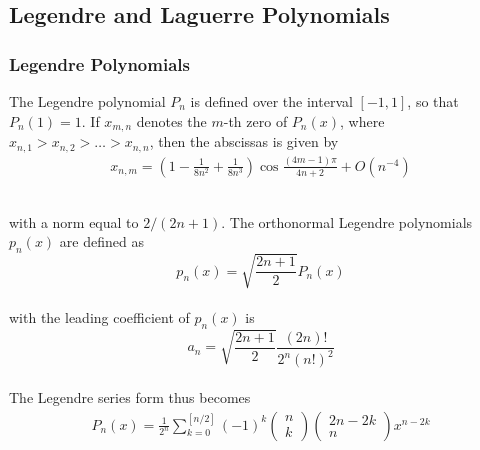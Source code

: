 \documentclass[%
reprint,
amsmath,amssymb,
aps,
]{revtex4-1}
\begin{document}
\subsection{Legendre and Laguerre Polynomials}
\subsubsection{Legendre Polynomials} \noindent 
The Legendre polynomial $P_n$ is defined over the interval $[-1,1]$, so that $P_n(1) = 1$. If $x_{m,n}$ denotes the $m$-th zero of $P_n(x)$, where $x_{n,1} > x_{n,2} > \dots > x_{n,n} $, then the abscissas is given by \vspace{2mm} \\ 
\begin{align}\label{abs}
x_{n, m}=\left(1-\frac{1}{8 n^{2}}+\frac{1}{8 n^{3}}\right) \cos \frac{(4 m-1) \pi}{4 n+2}+O\left(n^{-4}\right) \nonumber \\ \nonumber \\ 
\end{align}\vspace{2mm} \\ 
with a norm equal to $2/(2n+1)$. The orthonormal Legendre polynomials $p_n(x)$ are defined as \vspace{2mm} \\
\begin{equation*}
p_{n}(x)=\sqrt{\frac{2 n+1}{2}} P_{n}(x)
\end{equation*}\vspace{2mm} \\
with the leading coefficient of $p_n(x)$ is \vspace{2mm} \\
\begin{equation*}
a_{n}=\sqrt{\frac{2 n+1}{2}} \frac{(2 n) !}{2^{n}(n !)^{2}}
\end{equation*}\vspace{2mm} \\
The Legendre series form thus becomes \vspace{2mm} \\
\begin{align}\label{polyleg}
P_{n}(x)=\frac{1}{2^{n}} \sum_{k=0}^{[n / 2]}(-1)^{k}\left(\begin{array}{l}{n} \\ {k}\end{array}\right)\left(\begin{array}{c}{2 n-2 k} \\ {n}\end{array}\right) x^{n-2 k} \nonumber \\ \nonumber \\ 
\end{align} 
\end{document}
